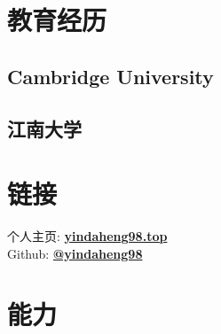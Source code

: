 \documentclass[]{deedy-resume-openfont}
\begin{document}
%
%

%
%

%
%

\begin{minipage}[t]{0.25\textwidth}


	\section{教育经历}
    \subsection{Cambridge University}
    \sectionsep
	\subsection{江南大学}
    \sectionsep
    

	\section{链接}
	个人主页:  \href{http://yindaheng98.top:8888}{\bf yindaheng98.top} \\
	Github: \href{https://github.com/yindaheng98}{\bf @yindaheng98} \\
	\sectionsep




	\section{能力}

\end{minipage}
\end{document}
